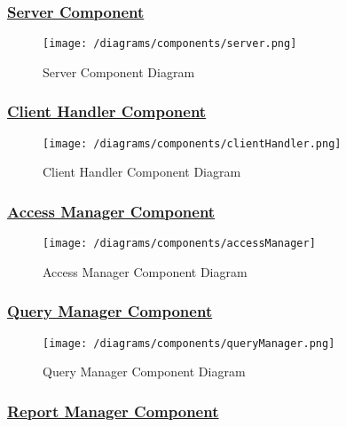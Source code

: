 		\subsubsection[Server Component]{\hyperlink{toc}{Server Component}}
			\label{sec:serverComponent}
			
			\begin{figure}[ht]
				\centering
				\texttt{[image: /diagrams/components/server.png]}
				\caption{\label{fig:serverComp} Server Component Diagram}
			\end{figure}
		
		\subsubsection[Client Handler Component]{\hyperlink{toc}{Client Handler Component}}
			\label{sec:clientHandlerComponent}
			
			\begin{figure}[ht]
				\centering
				\texttt{[image: /diagrams/components/clientHandler.png]}
				\caption{\label{fig:clientHandlerComp} Client Handler Component Diagram}
			\end{figure}
		
		\subsubsection[Access Manager Component]{\hyperlink{toc}{Access Manager Component}}
			\label{sec:accessManagerComponent}
			
			\begin{figure}[ht]
				\centering
				\texttt{[image: /diagrams/components/accessManager]}
				\caption{\label{fig:accessManagerComp} Access Manager Component Diagram}
			\end{figure}
		
		\subsubsection[Query Manager Component]{\hyperlink{toc}{Query Manager Component}}
			\label{sec:queryManagerComponent}
			
			\begin{figure}[ht]
				\centering
				\texttt{[image: /diagrams/components/queryManager.png]}
				\caption{\label{fig:queryManagerComp} Query Manager Component Diagram}
			\end{figure}
		
		\subsubsection[Report Manager Component]{\hyperlink{toc}{Report Manager Component}}
			\label{sec:reportManagerComponent}
			
